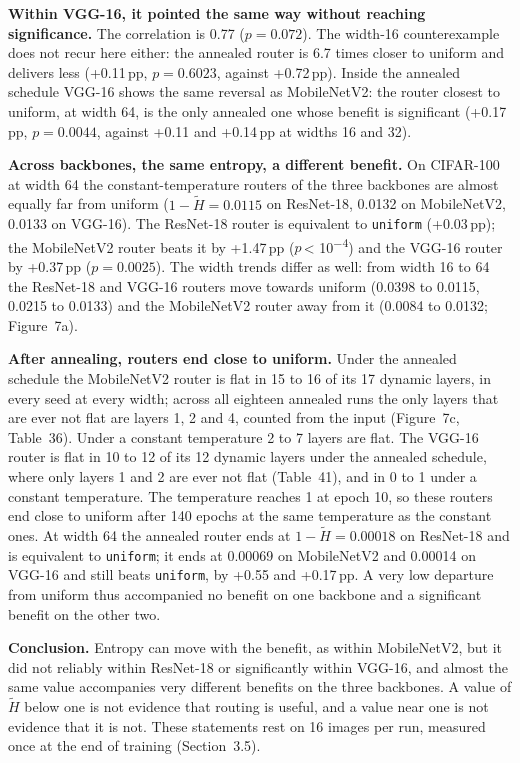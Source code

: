 \documentclass{article}
\begin{document}
\textbf{Within VGG-16, it pointed the same way without reaching
significance.}  The correlation is 0.77 ($p=0.072$). The width-16
counterexample does not recur here either: the annealed router is
6.7 times closer to uniform and delivers less (+0.11\,pp,
$p=0.6023$, against +0.72\,pp). Inside the annealed schedule
VGG-16 shows the same reversal as MobileNetV2: the router closest to
uniform, at width 64, is the only annealed one whose benefit is
significant (+0.17\,pp, $p=0.0044$, against +0.11 and
+0.14\,pp at widths 16 and 32).

\textbf{Across backbones, the same entropy, a different benefit.}  On
CIFAR-100 at width 64 the constant-temperature routers of the three
backbones are almost equally far from uniform ($1-\tilde H=0.0115$ on
ResNet-18, 0.0132 on MobileNetV2, 0.0133 on VGG-16). The ResNet-18
router is equivalent to \texttt{uniform} (+0.03\,pp); the MobileNetV2
router beats it by +1.47\,pp ($p$\,< 10\textsuperscript{−4}) and the VGG-16 router
by +0.37\,pp ($p=0.0025$). The width trends differ as well: from
width 16 to 64 the ResNet-18 and VGG-16 routers move towards uniform
(0.0398 to 0.0115, 0.0215 to 0.0133) and the MobileNetV2 router
away from it (0.0084 to 0.0132; Figure~7a).

\textbf{After annealing, routers end close to uniform.}  Under the
annealed schedule the MobileNetV2 router is flat in 15 to
16 of its 17 dynamic layers, in every seed at every
width; across all eighteen annealed runs the only layers that are ever not
flat are layers 1, 2 and 4, counted from the input
(Figure~7c, Table~36). Under a constant
temperature 2 to 7 layers are flat. The VGG-16
router is flat in 10 to 12 of its 12
dynamic layers under the annealed schedule, where only layers
1 and 2 are ever not flat (Table~41), and in
0 to 1 under a constant temperature. The
temperature reaches 1 at epoch 10, so these routers end close to uniform
after 140 epochs at the same temperature as the constant ones. At width
64 the annealed router ends at $1-\tilde H=0.00018$ on ResNet-18 and is
equivalent to \texttt{uniform}; it ends at 0.00069 on MobileNetV2 and
0.00014 on VGG-16 and still beats \texttt{uniform}, by +0.55 and
+0.17\,pp. A very low departure from uniform thus accompanied no
benefit on one backbone and a significant benefit on the other two.

\textbf{Conclusion.}  Entropy can move with the benefit, as within
MobileNetV2, but it did not reliably within ResNet-18 or significantly
within VGG-16, and almost the same value accompanies very different
benefits on the three backbones. A value of
$\tilde H$ below one is not evidence that routing is useful, and a value
near one is not evidence that it is not. These statements rest on 16
images per run, measured once at the end of training
(Section~3.5).
\end{document}

